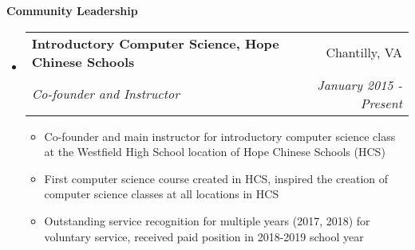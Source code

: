 \documentclass[letterpaper,11pt]{article}
\makeatletter
\newcommand{\resitem}[1]{\item #1 \vspace{-2pt}}
\newcommand{\resheading}[1]{{\large \colorbox{mygrey}{\begin{minipage}{\textwidth}{\textbf{#1 \vphantom{p\^{E}}}}\end{minipage}}}}
\newcommand{\ressubheading}[4]{
\begin{tabular*}{7.0in}{l@{\extracolsep{\fill}}r}
		\textbf{#1} & #2 \\
		\textit{#3} & \textit{#4} \\
\end{tabular*}\vspace{-6pt}}
\makeatother
\begin{document}
\resheading{Community Leadership}
\begin{itemize}
\item
	\ressubheading{Introductory Computer Science, Hope Chinese Schools}{Chantilly, VA}{Co-founder and Instructor}{January 2015 - Present}
	\begin{itemize}
		\resitem{Co-founder and main instructor for introductory computer science class at the Westfield High School location of Hope Chinese Schools (HCS)}
		\resitem{First computer science course created in HCS, inspired the creation of computer science classes at all locations in HCS}
	    \resitem{Outstanding service recognition for multiple years (2017, 2018) for voluntary service, received paid position in 2018-2019 school year}
	\end{itemize}
	
\end{itemize}
\end{document}
